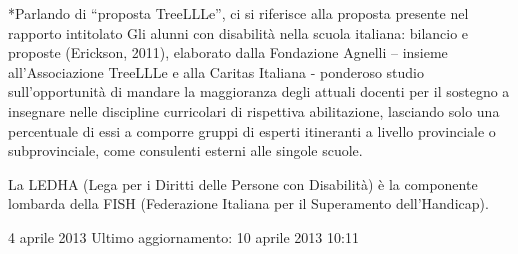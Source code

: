 *Parlando di “proposta TreeLLLe”, ci si riferisce alla proposta presente nel rapporto intitolato Gli alunni con disabilità nella scuola italiana: bilancio e proposte (Erickson, 2011), elaborato dalla Fondazione Agnelli – insieme all’Associazione TreeLLLe e alla Caritas Italiana - ponderoso studio sull’opportunità di mandare la maggioranza degli attuali docenti per il sostegno a insegnare nelle discipline curricolari di rispettiva abilitazione, lasciando solo una percentuale di essi a comporre gruppi di esperti itineranti a livello provinciale o subprovinciale, come consulenti esterni alle singole scuole.

La LEDHA (Lega per i Diritti delle Persone con Disabilità) è la componente lombarda della FISH (Federazione Italiana per il Superamento dell’Handicap).

4 aprile 2013
Ultimo aggiornamento: 10 aprile 2013 10:11